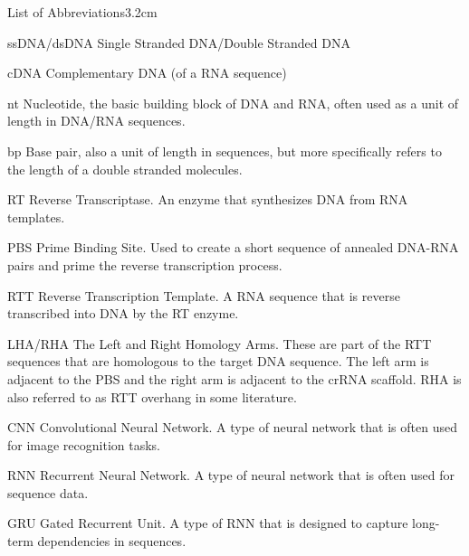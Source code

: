 \begin{mclistof}{List of Abbreviations}{3.2cm}

    \item[ssDNA/dsDNA] Single Stranded DNA/Double Stranded DNA
    
    \item[cDNA] Complementary DNA (of a RNA sequence)
    
    \item[nt] Nucleotide, the basic building block of DNA and RNA, often used as a unit of length in DNA/RNA sequences.
    
    \item[bp] Base pair, also a unit of length in sequences, but more specifically refers to the length of a double stranded molecules.   

    \item[RT] Reverse Transcriptase. An enzyme that synthesizes DNA from RNA templates.

    \item[PBS] Prime Binding Site. Used to create a short sequence of annealed DNA-RNA pairs and prime the reverse transcription process. 

    \item[RTT] Reverse Transcription Template. A RNA sequence that is reverse transcribed into DNA by the RT enzyme.

    \item[LHA/RHA] The Left and Right Homology Arms. These are part of the RTT sequences that are homologous to the target DNA sequence. The left arm is adjacent to the PBS and the right arm is adjacent to the crRNA scaffold. RHA is also referred to as RTT overhang in some literature.
    
    \item[CNN] Convolutional Neural Network. A type of neural network that is often used for image recognition tasks.
    
    \item[RNN] Recurrent Neural Network. A type of neural network that is often used for sequence data.
    
    \item[GRU] Gated Recurrent Unit. A type of RNN that is designed to capture long-term dependencies in sequences.

\end{mclistof} 